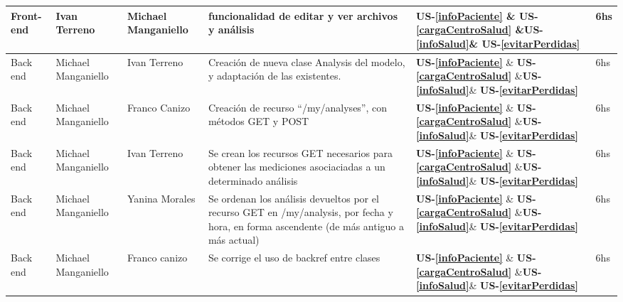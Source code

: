 {\begin{center}
{\begin{tabular}{|l|p{3cm}|l|p{6cm}|p{2cm}|p{1cm}|}
				       
				Front-end& Ivan Terreno& Michael Manganiello &  funcionalidad de editar y ver archivos y análisis &\textbf{US-\ref{infoPaciente}} \& \textbf{US-\ref{cargaCentroSalud}} \&\textbf{US-\ref{infoSalud}}\& \textbf{US-\ref{evitarPerdidas} } 
				 & 6hs
				\\ \hline
				
				
				Back end& Michael Manganiello & Ivan Terreno& Creación de nueva clase Analysis del modelo, y adaptación de las existentes. &
				\textbf{US-\ref{infoPaciente}} \& \textbf{US-\ref{cargaCentroSalud}} \&\textbf{US-\ref{infoSalud}}\& \textbf{US-\ref{evitarPerdidas} } 
				 & 6hs
				\\ \hline
				
				
				
				Back end& Michael Manganiello & Franco Canizo& Creación de recurso ``/my/analyses'', con métodos GET y POST & \textbf{US-\ref{infoPaciente}} \& \textbf{US-\ref{cargaCentroSalud}} \&\textbf{US-\ref{infoSalud}}\& \textbf{US-\ref{evitarPerdidas} } 
				& 6hs
				\\ \hline   
				
				      
				Back end& Michael Manganiello & Ivan Terreno& Se crean los recursos GET necesarios para obtener las mediciones asociaciadas a un determinado análisis & \textbf{US-\ref{infoPaciente}} \& \textbf{US-\ref{cargaCentroSalud}} \&\textbf{US-\ref{infoSalud}}\& \textbf{US-\ref{evitarPerdidas} } 
				& 6hs
				\\ \hline   
				     
				      
				      
				Back end& Michael Manganiello& Yanina Morales & Se ordenan los análisis devueltos por el recurso GET en /my/analysis, por fecha y hora, en forma ascendente (de más antiguo a más actual) & \textbf{US-\ref{infoPaciente}} \& \textbf{US-\ref{cargaCentroSalud}} \&\textbf{US-\ref{infoSalud}}\& \textbf{US-\ref{evitarPerdidas} } 
				 & 6hs
				\\ \hline 
				
				
				Back end& Michael Manganiello& Franco canizo & Se corrige el uso de backref entre clases & \textbf{US-\ref{infoPaciente}} \& \textbf{US-\ref{cargaCentroSalud}} \&\textbf{US-\ref{infoSalud}}\& \textbf{US-\ref{evitarPerdidas} } 
				& 6hs
				\\ \hline
				
				
			\end{tabular}
		}
	\end{center}
}


